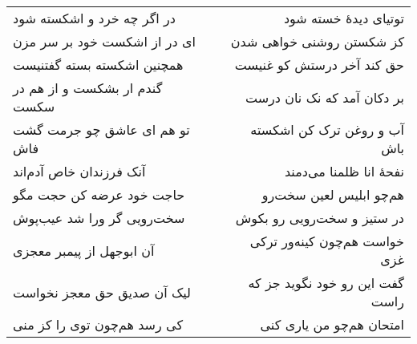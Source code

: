 \begin{center}
\begin{longtable}{l p{0.5cm} r}
در اگر چه خرد و اشکسته شود
&&
توتیای دیدهٔ خسته شود
\\
ای در از اشکست خود بر سر مزن
&&
کز شکستن روشنی خواهی شدن
\\
همچنین اشکسته بسته گفتنیست
&&
حق کند آخر درستش کو غنیست
\\
گندم ار بشکست و از هم در سکست
&&
بر دکان آمد که نک نان درست
\\
تو هم ای عاشق چو جرمت گشت فاش
&&
آب و روغن ترک کن اشکسته باش
\\
آنک فرزندان خاص آدم‌اند
&&
نفحهٔ انا ظلمنا می‌دمند
\\
حاجت خود عرضه کن حجت مگو
&&
هم‌چو ابلیس لعین سخت‌رو
\\
سخت‌رویی گر ورا شد عیب‌پوش
&&
در ستیز و سخت‌رویی رو بکوش
\\
آن ابوجهل از پیمبر معجزی
&&
خواست هم‌چون کینه‌ور ترکی غزی
\\
لیک آن صدیق حق معجز نخواست
&&
گفت این رو خود نگوید جز که راست
\\
کی رسد هم‌چون توی را کز منی
&&
امتحان هم‌چو من یاری کنی
\\
\end{longtable}
\end{center}
